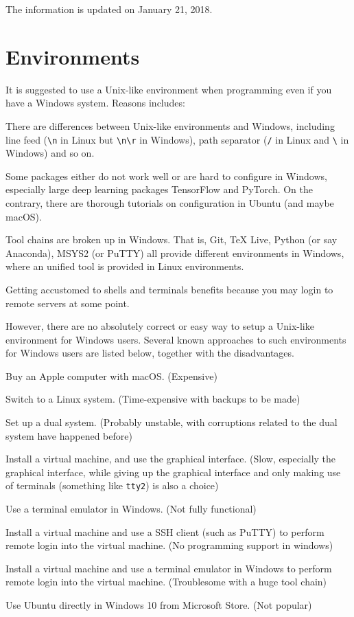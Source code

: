 \documentclass[english]{../TeXTemplate/pkupaper}
\title{\titlemark}
\author{pppppass}
\date{January 22, 2018}
\begin{document}
\maketitle

The information is updated on January 21, 2018.

\section{Environments}

It is suggested to use a Unix-like environment when programming even if you have a Windows system. Reasons includes:
\begin{partlist}
\item There are differences between Unix-like environments and Windows, including line feed (\verb"\n" in Linux but \verb"\n\r" in Windows), path separator (\verb"/" in Linux and \verb"\" in Windows) and so on.
\item Some packages either do not work well or are hard to configure in Windows, especially large deep learning packages TensorFlow and PyTorch. On the contrary, there are thorough tutorials on configuration in Ubuntu (and maybe macOS).
\item Tool chains are broken up in Windows. That is, Git, TeX Live, Python (or say Anaconda), MSYS2 (or PuTTY) all provide different environments in Windows, where an unified tool is provided in Linux environments.
\item Getting accustomed to shells and terminals benefits because you may login to remote servers at some point.
\end{partlist}

However, there are no absolutely correct or easy way to setup a Unix-like environment for Windows users. Several known approaches to such environments for Windows users are listed below, together with the disadvantages.
\begin{partlist}
\item Buy an Apple computer with macOS. (Expensive)
\item Switch to a Linux system. (Time-expensive with backups to be made)
\item Set up a dual system. (Probably unstable, with corruptions related to the dual system have happened before)
\item Install a virtual machine, and use the graphical interface. (Slow, especially the graphical interface, while giving up the graphical interface and only making use of terminals (something like \verb"tty2") is also a choice)
\item Use a terminal emulator in Windows. (Not fully functional)
\item Install a virtual machine and use a SSH client (such as PuTTY) to perform remote login into the virtual machine. (No programming support in windows)
\item Install a virtual machine and use a terminal emulator in Windows to perform remote login into the virtual machine. (Troublesome with a huge tool chain)
\item Use Ubuntu directly in Windows 10 from Microsoft Store. (Not popular)
\end{partlist}
\end{document}
